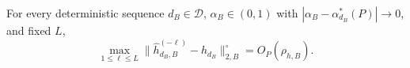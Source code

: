 For every deterministic sequence \(d_B\in\mathcal D\), \(\alpha_B\in(0,1)\) with \(|\alpha_B-\alpha_{d_B}^*(P)|\to0\), and fixed \(L\),
\[
\max_{1\le\ell\le L}\|\widehat h_{d_B,B}^{(-\ell)}-h_{d_B}\|_{2,B}^{\circ}=O_P(\rho_{h,B}).
\]